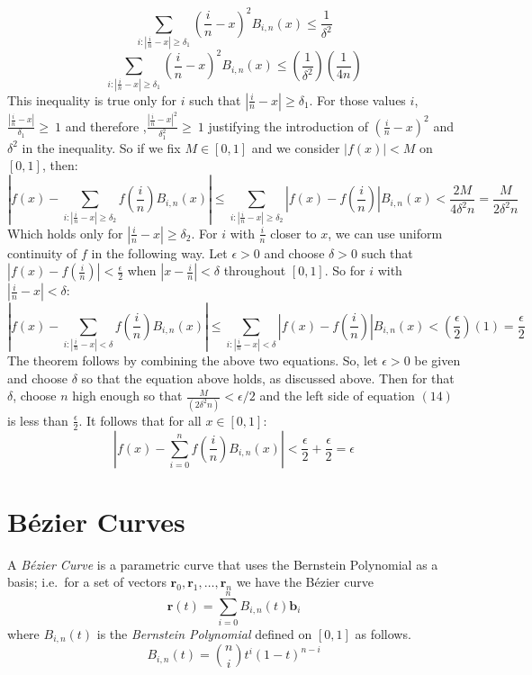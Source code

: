 \documentclass{article}
\begin{document}
\begin{equation}
\sum_{i:|\frac{i}{n}-x|\geq\delta_1}(\frac{i}{n}-x)^2B_{i,n}(x)\leq\frac{1}{\delta^2}
\end{equation}
\begin{equation}
\sum_{i:|\frac{i}{n}-x|\geq\delta_1}(\frac{i}{n}-x)^2B_{i,n}(x)\leq(\frac{1}{\delta^2})(\frac{1}{4n})
\end{equation}
This inequality is true only for $i$ such that $|\frac{i}{n}-x|\geq\delta_1$. For those values $i$, $\frac{|\frac{i}{n}-x|}{\delta_1}\geq\ 1$ and therefore ,$\frac{|\frac{i}{n}-x|^2}{\delta_1^2}\geq\ 1$ justifying the introduction of $(\frac{i}{n}-x)^2$ and $\delta^2$ in the inequality. So if we fix $M\in[0,1]$ and we consider $|f(x)|<M$ on $[0,1]$, then:
\begin{equation}
\left|f(x)-\sum_{i:|\frac{i}{n}-x|\geq\delta_2}f(\frac{i}{n})B_{i,n}(x)\right|\leq\sum_{i:|\frac{i}{n}-x|\geq\delta_2}\left|f(x)-f(\frac{i}{n})\right|B_{i,n}(x)<\frac{2M}{4\delta^2n}=\frac{M}{2\delta^2n}
\end{equation}
Which holds only for $|\frac{i}{n}-x|\geq\delta_2$. For $i$ with $\frac{i}{n}$ closer to $x$, we can use uniform continuity of $f$ in the following way. Let $\epsilon>0$  and choose $\delta>0$ such that $|f(x)-f(\frac{i}{n})|<\frac{\epsilon}{2}$ when $|x- \frac{i}{n}|<\delta$ throughout $[0,1]$. So for $i$ with $|\frac{i}{n}-x|<\delta$:
\begin{equation}
\left|f(x)-\sum_{i:|\frac{i}{n}-x|<\delta}f(\frac{i}{n})B_{i,n}(x)\right|\leq\sum_{i:|\frac{i}{n}-x|<\delta}\left|f(x)-f(\frac{i}{n})\right|B_{i,n}(x)<\left(\frac{\epsilon}{2}\right)(1)= \frac{\epsilon}{2}   
\end{equation}
The theorem follows by combining the above two equations. So, let $\epsilon>0$ be given and choose $\delta$ so that the equation above holds, as discussed above. Then for that $\delta$, choose $n$ high enough so that $\frac{M}{(2\delta^2n)}<\epsilon/2$ and the left side of equation $(14)$ is less than $\frac{\epsilon}{2}$. It follows that for all $x\in[0,1]$:
\begin{equation}
\left|f(x)-\sum_{i=0}^nf(\frac{i}{n})B_{i,n}(x)\right|<\frac{\epsilon}{2}+\frac{\epsilon}{2}=\epsilon    
\end{equation}

\section{B\'ezier Curves}\label{sec:bec}
A \emph{B\'ezier Curve} is a parametric curve that uses the Bernstein Polynomial as a basis; %
i.e.\ for a set of vectors $\mathbf{r}_0, \mathbf{r}_1, \dots, \mathbf{r}_n$ we have the B\'ezier curve
\begin{equation} \label{eq:bec:1}
\mathbf{r}(t) = \sum_{i=0}^{n} B_{i,n}(t) \mathbf{b}_i
\end{equation}
where $B_{i,n}(t)$ is the \emph{Bernstein Polynomial} defined on $\left[0,1 \right]$ as follows.
\[
  B_{i,n}(t) = \binom{n}{i} t^i (1 - t)^{n-i}
\]
\end{document}

